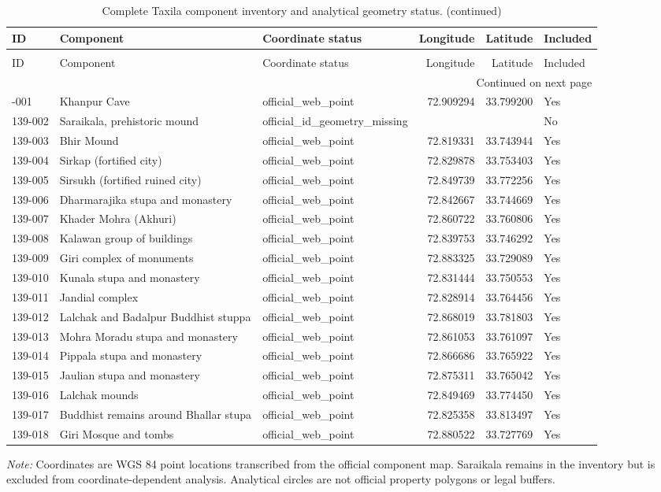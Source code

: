 \begingroup
\scriptsize
\setlength{\tabcolsep}{3pt}
\begin{longtable}{p{}p{}p{}rrp{}}
\caption{Complete Taxila component inventory and analytical geometry status.}\label{tab:s-component-inventory}\\
\toprule
ID & Component & Coordinate status & Longitude & Latitude & Included \\
\midrule
\endfirsthead
\caption[]{Complete Taxila component inventory and analytical geometry status. (continued)}\\
\toprule
ID & Component & Coordinate status & Longitude & Latitude & Included \\
\midrule
\endhead
\midrule
\multicolumn{6}{r}{Continued on next page}\\
\endfoot
\bottomrule
\endlastfoot
139-001 & Khanpur Cave & official\_web\_point & 72.909294 & 33.799200 & Yes \\
139-002 & Saraikala, prehistoric mound & official\_id\_geometry\_missing &  &  & No \\
139-003 & Bhir Mound & official\_web\_point & 72.819331 & 33.743944 & Yes \\
139-004 & Sirkap (fortified city) & official\_web\_point & 72.829878 & 33.753403 & Yes \\
139-005 & Sirsukh (fortified ruined city) & official\_web\_point & 72.849739 & 33.772256 & Yes \\
139-006 & Dharmarajika stupa and monastery & official\_web\_point & 72.842667 & 33.744669 & Yes \\
139-007 & Khader Mohra (Akhuri) & official\_web\_point & 72.860722 & 33.760806 & Yes \\
139-008 & Kalawan group of buildings & official\_web\_point & 72.839753 & 33.746292 & Yes \\
139-009 & Giri complex of monuments & official\_web\_point & 72.883325 & 33.729089 & Yes \\
139-010 & Kunala stupa and monastery & official\_web\_point & 72.831444 & 33.750553 & Yes \\
139-011 & Jandial complex & official\_web\_point & 72.828914 & 33.764456 & Yes \\
139-012 & Lalchak and Badalpur Buddhist stuppa & official\_web\_point & 72.868019 & 33.781803 & Yes \\
139-013 & Mohra Moradu stupa and monastery & official\_web\_point & 72.861053 & 33.761097 & Yes \\
139-014 & Pippala stupa and monastery & official\_web\_point & 72.866686 & 33.765922 & Yes \\
139-015 & Jaulian stupa and monastery & official\_web\_point & 72.875311 & 33.765042 & Yes \\
139-016 & Lalchak mounds & official\_web\_point & 72.849469 & 33.774450 & Yes \\
139-017 & Buddhist remains around Bhallar stupa & official\_web\_point & 72.825358 & 33.813497 & Yes \\
139-018 & Giri Mosque and tombs & official\_web\_point & 72.880522 & 33.727769 & Yes \\
\end{longtable}
\noindent\textit{Note:} Coordinates are WGS 84 point locations transcribed from the official component map. Saraikala remains in the inventory but is excluded from coordinate-dependent analysis. Analytical circles are not official property polygons or legal buffers.
\endgroup
